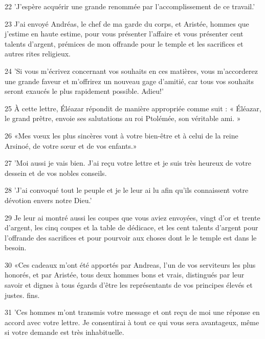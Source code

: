 \par 22 'J'espère acquérir une grande renommée par l'accomplissement de ce travail.'

\par 23 J'ai envoyé Andréas, le chef de ma garde du corps, et Aristée, hommes que j'estime en haute estime, pour vous présenter l'affaire et vous présenter cent talents d'argent, prémices de mon offrande pour le temple et les sacrifices et autres rites religieux.

\par 24 'Si vous m'écrivez concernant vos souhaits en ces matières, vous m'accorderez une grande faveur et m'offrirez un nouveau gage d'amitié, car tous vos souhaits seront exaucés le plus rapidement possible. Adieu!'

\par 25 À cette lettre, Éléazar répondit de manière appropriée comme suit : « Éléazar, le grand prêtre, envoie ses salutations au roi Ptolémée, son véritable ami. »

\par 26 «Mes vœux les plus sincères vont à votre bien-être et à celui de la reine Arsinoé, de votre sœur et de vos enfants.»

\par 27 'Moi aussi je vais bien. J'ai reçu votre lettre et je suis très heureux de votre dessein et de vos nobles conseils.

\par 28 'J'ai convoqué tout le peuple et je le leur ai lu afin qu'ils connaissent votre dévotion envers notre Dieu.'

\par 29 Je leur ai montré aussi les coupes que vous aviez envoyées, vingt d'or et trente d'argent, les cinq coupes et la table de dédicace, et les cent talents d'argent pour l'offrande des sacrifices et pour pourvoir aux choses dont le le temple est dans le besoin.

\par 30 «Ces cadeaux m'ont été apportés par Andreas, l'un de vos serviteurs les plus honorés, et par Aristée, tous deux hommes bons et vrais, distingués par leur savoir et dignes à tous égards d'être les représentants de vos principes élevés et justes. fins.

\par 31 'Ces hommes m'ont transmis votre message et ont reçu de moi une réponse en accord avec votre lettre. Je consentirai à tout ce qui vous sera avantageux, même si votre demande est très inhabituelle.

